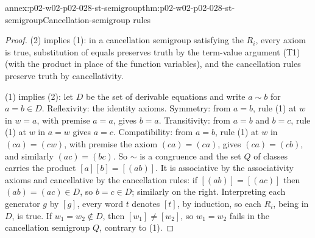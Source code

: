 \begin{annexitem}{annex:p02-w02-p02-028-st-semigroup}{thm:p02-w02-p02-028-st-semigroup}{Cancellation-semigroup rules}
\begin{proof}
(2) implies (1): in a cancellation semigroup satisfying the \(R_i\), every
axiom is true, substitution of equals preserves truth by the term-value
argument (T1) (with the product in place of the function variables), and the
cancellation rules preserve truth by cancellativity.

(1) implies (2): let \(D\) be the set of derivable equations and write
\(a\sim b\) for \(a=b\in D\).  Reflexivity: the identity axioms.  Symmetry:
from \(a=b\), rule (1) at \(w\) in \(w=a\), with premise \(a=a\), gives
\(b=a\).  Transitivity: from \(a=b\) and \(b=c\), rule (1) at \(w\) in
\(a=w\) gives \(a=c\).  Compatibility: from \(a=b\), rule (1) at \(w\) in
\((ca)=(cw)\), with premise the axiom \((ca)=(ca)\), gives \((ca)=(cb)\), and
similarly \((ac)=(bc)\).  So \(\sim\) is a congruence and the set \(Q\) of
classes carries the product \([a][b]=[(ab)]\).  It is associative by the
associativity axioms and cancellative by the cancellation rules: if
\([(ab)]=[(ac)]\) then \((ab)=(ac)\in D\), so \(b=c\in D\); similarly on the
right.  Interpreting each generator \(g\) by \([g]\), every word \(t\)
denotes \([t]\), by induction, so each \(R_i\), being in \(D\), is true.  If
\(w_1=w_2\notin D\), then \([w_1]\neq[w_2]\), so \(w_1=w_2\) fails in the
cancellation semigroup \(Q\), contrary to (1).
\end{proof}
\end{annexitem}

